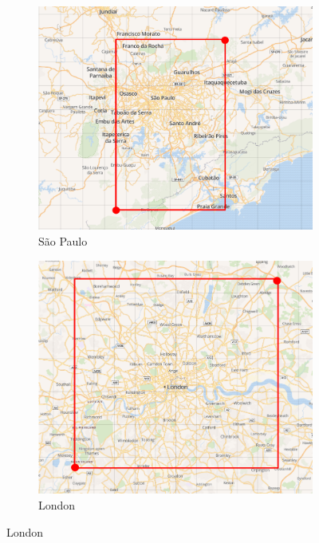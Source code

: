 \begin{figure}[t]
	\centering
	\begin{subfigure}[t]{0.31\textwidth}
		\centering
		\includegraphics[width=1\linewidth]{figures/sp_bb.png}
		\caption{São Paulo}
		\label{fig:saopaulo_bounding_box}
	\end{subfigure}%
	\quad
	\begin{subfigure}[t]{0.3\textwidth}
		\centering
		\includegraphics[width=1\linewidth]{figures/london_bb.png}
		\caption{London}
		\label{fig:london_bounding_box}
	\end{subfigure}

\end{figure}
